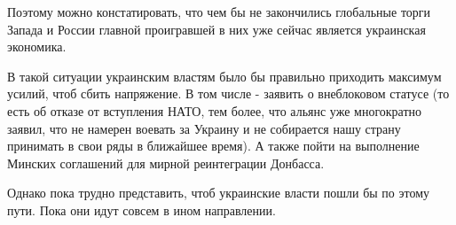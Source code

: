 Поэтому можно констатировать, что чем бы не закончились глобальные торги Запада
и России главной проигравшей в них уже сейчас является украинская экономика.

В такой ситуации украинским властям было бы правильно приходить максимум
усилий, чтоб сбить напряжение. В том числе - заявить о внеблоковом статусе (то
есть об отказе от вступления НАТО, тем более, что альянс уже многократно
заявил, что не намерен воевать за Украину и не собирается нашу страну принимать
в свои ряды в ближайшее время). А также пойти на выполнение Минских соглашений
для мирной реинтеграции Донбасса.

Однако пока трудно представить, чтоб украинские власти пошли бы по этому пути.
Пока они идут совсем в ином направлении. 


